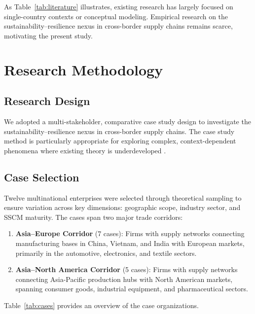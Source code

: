 \documentclass[12pt,a4paper,twoside]{article}
\begin{document}
As Table~\ref{tab:literature} illustrates, existing research has largely focused
on single-country contexts or conceptual modeling.  Empirical research on the
sustainability--resilience nexus in cross-border supply chains remains scarce,
motivating the present study.

\section{Research Methodology}
\label{sec:methodology}

\subsection{Research Design}

We adopted a multi-stakeholder, comparative case study design
\citep{yin2018case, eisenhardt1989building} to investigate the
sustainability--resilience nexus in cross-border supply chains.  The case study
method is particularly appropriate for exploring complex, context-dependent
phenomena where existing theory is underdeveloped \citep{eisenhardt2007theory}.

\subsection{Case Selection}

Twelve multinational enterprises were selected through theoretical sampling
\citep{glasser1967discovery} to ensure variation across key dimensions:
geographic scope, industry sector, and SSCM maturity.  The cases span two major
trade corridors:

\begin{enumerate}
  \item \textbf{Asia--Europe Corridor} (7 cases): Firms with supply networks
        connecting manufacturing bases in China, Vietnam, and India with
        European markets, primarily in the automotive, electronics, and textile
        sectors.
  \item \textbf{Asia--North America Corridor} (5 cases): Firms with supply
        networks connecting Asia-Pacific production hubs with North American
        markets, spanning consumer goods, industrial equipment, and
        pharmaceutical sectors.
\end{enumerate}

Table~\ref{tab:cases} provides an overview of the case organizations.
\end{document}
